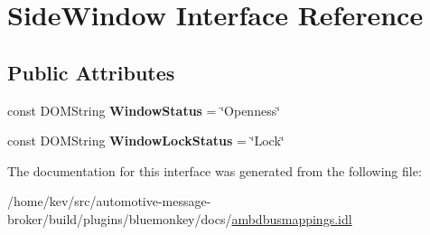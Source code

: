 \hypertarget{interfaceSideWindow}{\section{Side\+Window Interface Reference}
\label{interfaceSideWindow}
}
\subsection*{Public Attributes}
\begin{DoxyCompactItemize}
\item 
\hypertarget{interfaceSideWindow_a8968254d124d26de8d55d58430fa3de7}{const D\+O\+M\+String {\bfseries Window\+Status} = \char`\"{}Openness\char`\"{}}\label{interfaceSideWindow_a8968254d124d26de8d55d58430fa3de7}

\item 
\hypertarget{interfaceSideWindow_a01854da7f347d50a309314a150a028fe}{const D\+O\+M\+String {\bfseries Window\+Lock\+Status} = \char`\"{}Lock\char`\"{}}\label{interfaceSideWindow_a01854da7f347d50a309314a150a028fe}

\end{DoxyCompactItemize}


The documentation for this interface was generated from the following file\+:\begin{DoxyCompactItemize}
\item 
/home/kev/src/automotive-\/message-\/broker/build/plugins/bluemonkey/docs/\hyperlink{ambdbusmappings_8idl}{ambdbusmappings.\+idl}\end{DoxyCompactItemize}
